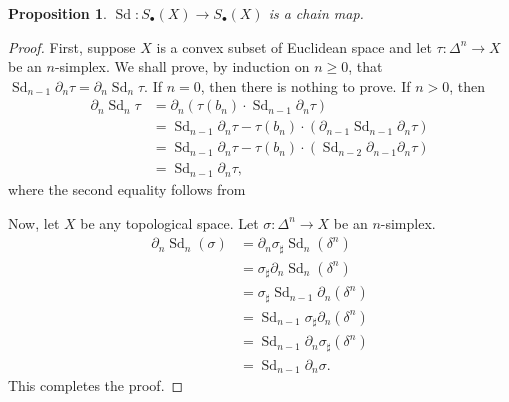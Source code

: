 \documentclass[10pt]{article}
\theoremstyle{thmstyle}
\newtheorem{proposition}[theorem]{Proposition}
\theoremstyle{defstyle}
\renewcommand{\ge}{\geqslant}
\newcommand{\Sd}{\operatorname{Sd}}
\begin{document}
\begin{proposition}
    $\Sd: S_\bullet(X)\to S_\bullet(X)$ is a chain map.
\end{proposition}
\begin{proof}
    First, suppose $X$ is a convex subset of Euclidean space and let $\tau:\Delta^n\to X$ be an $n$-simplex. We shall prove, by induction on $n\ge 0$, that $\Sd_{n - 1}\partial_n\tau = \partial_n\Sd_n\tau$. If $n = 0$, then there is nothing to prove. If $n > 0$, then 
    \begin{align*}
        \partial_n\Sd_n\tau &= \partial_n\left(\tau(b_n)\cdot\Sd_{n - 1}\partial_n\tau\right)\\
        &= \Sd_{n - 1}\partial_n\tau - \tau(b_n)\cdot\left(\partial_{n - 1}\Sd_{n - 1}\partial_n\tau\right)\\
        &= \Sd_{n - 1}\partial_n\tau - \tau(b_n)\cdot\left(\Sd_{n - 2}\partial_{n - 1}\partial_n\tau\right)\\
        &= \Sd_{n - 1}\partial_n\tau,
    \end{align*}
    where the second equality follows from 

    Now, let $X$ be any topological space. Let $\sigma:\Delta^n\to X$ be an $n$-simplex.
    \begin{align*}
        \partial_n\Sd_n(\sigma) &= \partial_n\sigma_\sharp\Sd_n(\delta^n)\\
        &= \sigma_\sharp\partial_n\Sd_{n}(\delta^n)\\
        &= \sigma_\sharp\Sd_{n - 1}\partial_n(\delta^n)\\
        &= \Sd_{n - 1}\sigma_\sharp\partial_n(\delta^n)\\
        &= \Sd_{n - 1}\partial_n\sigma_\sharp(\delta^n)\\
        &= \Sd_{n - 1}\partial_n\sigma.
    \end{align*}
    This completes the proof.
\end{proof}
\end{document}
